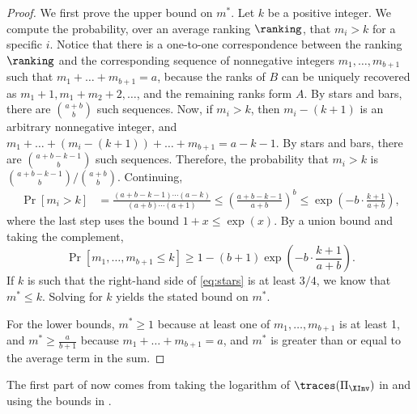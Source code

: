 \begin{proof}
We first prove the upper bound on $m^*$. Let $k$ be a positive integer. We compute the probability, over an average ranking $\ranking$, that $m_i> k$ for a specific $i$. 
Notice that there is a one-to-one correspondence between the ranking $\ranking$ and the corresponding sequence of nonnegative integers $m_1,\dots,m_{b+1}$ such that $m_1+\dots+m_{b+1}=a$, because the ranks of $B$ can be uniquely recovered as $m_1+1,m_1+m_2+2,\dots$, and the remaining ranks form $A$. By stars and bars, there are $\binom{a+b}{b}$ such sequences. Now, if $m_i>k$, then $m_i-(k+1)$ is an arbitrary nonnegative integer, and $m_1+\dots+(m_i-(k+1))+\dots+m_{b+1}=a-k-1$. By stars and bars, there are $\binom{a+b-k-1}{b}$ such sequences. Therefore, the probability that $m_i>k$ is $\binom{a+b-k-1}{b}/\binom{a+b}{b}$. Continuing,
\begin{align*}
\Pr[m_i> k]&=\frac{(a+b-k-1)\cdots (a-k)}{(a+b)\cdots (a+1)}
        \le \left(\frac{a+b-k-1}{a+b}\right)^b
        \le \exp\left(-b\cdot \frac{k+1}{a+b} \right),
\end{align*}
where the last step uses the bound $1+x \le \exp(x)$.
By a union bound and taking the complement,
    \begin{equation}\label{eq:stars}
        \Pr[m_1,\dots,m_{b+1}\le k] \ge 1-(b+1)\exp\left(-b\cdot \frac{k+1}{a+b} \right).
    \end{equation}
If $k$ is such that the right-hand side of \eqref{eq:stars} is at least $3/4$, we know that $m^* \le k$. Solving for $k$ yields the stated bound on $m^*$.
    
For the lower bounds, $m^*\ge 1$ because at least one of $m_1,\dots,m_{b+1}$ is at least 1, and $m^*\ge \frac{a}{b+1}$ because $m_1+\dots+m_{b+1}=a$, and $m^*$ is greater than or equal to the average term in the sum.
\end{proof}

The first part of  now comes from taking the logarithm of $\traces(\Pi_{\XInv})$ in  and using the bounds in .


